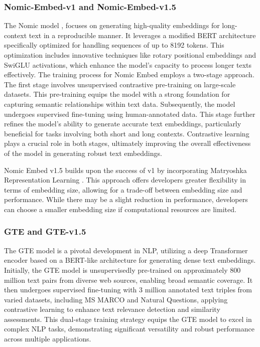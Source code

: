 \subsubsection{Nomic-Embed-v1 and Nomic-Embed-v1.5} \label{model:nomic-embed}
The Nomic model \cite{nussbaum2024nomic}, focuses on generating high-quality embeddings for long-context text in a reproducible manner.
It leverages a modified BERT architecture specifically optimized for handling sequences of up to 8192 tokens.
This optimization includes innovative techniques like rotary positional embeddings and SwiGLU activations, which enhance the model's capacity to process longer texts effectively.
The training process for Nomic Embed employs a two-stage approach.
The first stage involves unsupervised contrastive pre-training on large-scale datasets.
This pre-training equips the model with a strong foundation for capturing semantic relationships within text data.
Subsequently, the model undergoes supervised fine-tuning using human-annotated data.
This stage further refines the model's ability to generate accurate text embeddings, particularly beneficial for tasks involving both short and long contexts.
Contrastive learning plays a crucial role in both stages, ultimately improving the overall effectiveness of the model in generating robust text embeddings.

Nomic Embed v1.5 builds upon the success of v1 by incorporating Matryoshka Representation Learning \cite{kusupati2024matryoshka}.
This approach offers developers greater flexibility in terms of embedding size, allowing for a trade-off between embedding size and performance.
While there may be a slight reduction in performance, developers can choose a smaller embedding size if computational resources are limited.

\subsubsection{GTE and GTE-v1.5} \label{model:gte}
The \ac{GTE} model is a pivotal development in \ac{NLP}, utilizing a deep Transformer encoder based on a \ac{BERT}-like architecture for generating dense text embeddings.
Initially, the \ac{GTE} model is unsupervisedly pre-trained on approximately 800 million text pairs from diverse web sources, enabling broad semantic coverage.
It then undergoes supervised fine-tuning with 3 million annotated text triples from varied datasets, including MS MARCO and Natural Questions, applying contrastive learning to enhance text relevance detection and similarity assessments.
This dual-stage training strategy equips the \ac{GTE} model to excel in complex \ac{NLP} tasks, demonstrating significant versatility and robust performance across multiple applications.

